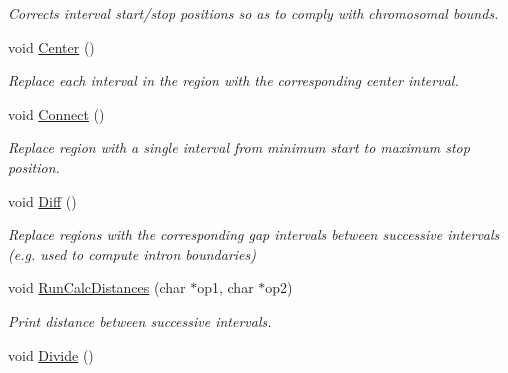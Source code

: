 \begin{DoxyCompactItemize}
\begin{DoxyCompactList}\small\item\em Corrects interval start/stop positions so as to comply with chromosomal bounds. \end{DoxyCompactList}\item 
\hypertarget{classGenomicRegionBED_a35c692c1343327d9cb450cfa1276096f}{
void \hyperlink{classGenomicRegionBED_a35c692c1343327d9cb450cfa1276096f}{Center} ()}
\label{classGenomicRegionBED_a35c692c1343327d9cb450cfa1276096f}

\begin{DoxyCompactList}\small\item\em Replace each interval in the region with the corresponding center interval. \end{DoxyCompactList}\item 
\hypertarget{classGenomicRegionBED_ad55a9ffea8b0924bac3d11a5722cdfd2}{
void \hyperlink{classGenomicRegionBED_ad55a9ffea8b0924bac3d11a5722cdfd2}{Connect} ()}
\label{classGenomicRegionBED_ad55a9ffea8b0924bac3d11a5722cdfd2}

\begin{DoxyCompactList}\small\item\em Replace region with a single interval from minimum start to maximum stop position. \end{DoxyCompactList}\item 
\hypertarget{classGenomicRegionBED_a9580179a120834e71ac90e56e5f35aa9}{
void \hyperlink{classGenomicRegionBED_a9580179a120834e71ac90e56e5f35aa9}{Diff} ()}
\label{classGenomicRegionBED_a9580179a120834e71ac90e56e5f35aa9}

\begin{DoxyCompactList}\small\item\em Replace regions with the corresponding gap intervals between successive intervals (e.g. used to compute intron boundaries) \end{DoxyCompactList}\item 
\hypertarget{classGenomicRegionBED_a833d50369e61f64603c63b6a05f3d80b}{
void \hyperlink{classGenomicRegionBED_a833d50369e61f64603c63b6a05f3d80b}{RunCalcDistances} (char $\ast$op1, char $\ast$op2)}
\label{classGenomicRegionBED_a833d50369e61f64603c63b6a05f3d80b}

\begin{DoxyCompactList}\small\item\em Print distance between successive intervals. \end{DoxyCompactList}\item 
\hypertarget{classGenomicRegionBED_abe056ec84d2d6890479d47559839bab4}{
void \hyperlink{classGenomicRegionBED_abe056ec84d2d6890479d47559839bab4}{Divide} ()}
\label{classGenomicRegionBED_abe056ec84d2d6890479d47559839bab4}


\end{DoxyCompactItemize}
